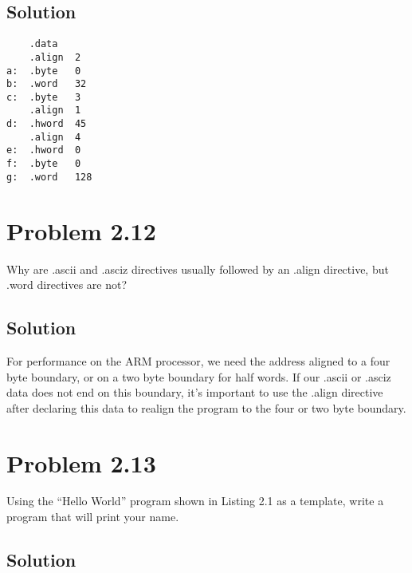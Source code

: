 \documentclass[letterpaper,11pt]{texMemo} %
\begin{document}
\subsection*{Solution}
\begin{lstlisting}
    .data
    .align  2
a:  .byte   0
b:  .word   32
c:  .byte   3
    .align  1
d:  .hword  45
    .align  4
e:  .hword  0
f:  .byte   0
g:  .word   128
\end{lstlisting}

\section*{Problem 2.12}
Why are .ascii and .asciz directives usually followed by an .align directive, but .word directives are not?
\subsection*{Solution}
For performance on the ARM processor, we need the address aligned to a four byte boundary, or on a two byte boundary
for half words. If our .ascii or .asciz data does not end on this boundary, it's important to use the .align directive
after declaring this data to realign the program to the four or two byte boundary.

\newpage
\section*{Problem 2.13}
Using the “Hello World” program shown in Listing 2.1 as a template, write a program that will print your name.
\subsection*{Solution}

\end{document}

